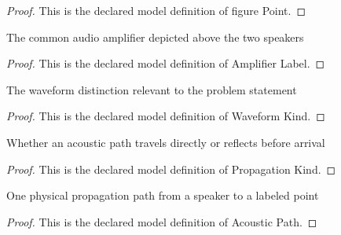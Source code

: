 \begin{proof}
  This is the declared model definition of figure Point.
\end{proof}
\begin{definition}
  \label{def:physics:phyx-mini-0170:phyxminiproblems-problemphyxmini0170-amplifierlabel}
  The common audio amplifier depicted above the two speakers
\end{definition}
\begin{proof}
  This is the declared model definition of Amplifier Label.
\end{proof}
\begin{definition}
  \label{def:physics:phyx-mini-0170:phyxminiproblems-problemphyxmini0170-waveformkind}
  The waveform distinction relevant to the problem statement
\end{definition}
\begin{proof}
  This is the declared model definition of Waveform Kind.
\end{proof}
\begin{definition}
  \label{def:physics:phyx-mini-0170:phyxminiproblems-problemphyxmini0170-propagationkind}
  Whether an acoustic path travels directly or reflects before arrival
\end{definition}
\begin{proof}
  This is the declared model definition of Propagation Kind.
\end{proof}
\begin{definition}
  \label{def:physics:phyx-mini-0170:phyxminiproblems-problemphyxmini0170-acousticpath}
  One physical propagation path from a speaker to a labeled point
\end{definition}
\begin{proof}
  This is the declared model definition of Acoustic Path.
\end{proof}
